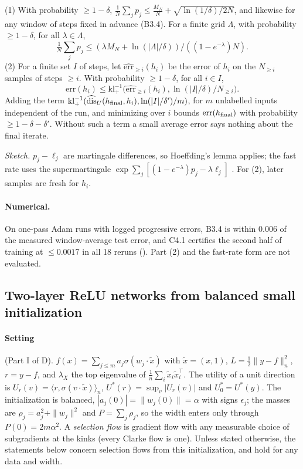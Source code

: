 \begin{proposition}[Propositions B3.4, C4.1, C4.2]\label{prop:C41}
(1) With probability $\ge1-\delta$, $\frac1N\sum_jp_j\le\frac{M_N}N+\sqrt{\ln(1/\delta)/2N}$, and likewise for any window of steps fixed in advance (B3.4). For a finite grid $\Lambda$, with probability $\ge1-\delta$, for all $\lambda\in\Lambda$,
\[
\tfrac1N\textstyle\sum_jp_j\le(\lambda M_N+\ln(|\Lambda|/\delta))/((1-e^{-\lambda})N).
\]
(2) For a finite set $I$ of steps, let $\widehat{\mathrm{err}}_{\ge i}(h_i)$ be the error of $h_i$ on the $N_{\ge i}$ samples of steps $\ge i$. With probability $\ge1-\delta$, for all $i\in I$,
\[
\mathrm{err}(h_i)\le\mathrm{kl}^{-1}_+\bigl(\widehat{\mathrm{err}}_{\ge i}(h_i),\ln(|I|/\delta)/N_{\ge i}\bigr).
\]
Adding the term $\mathrm{kl}^{-1}_+(\widehat{\mathrm{dis}}_U(h_{\rm final},h_i),\ln(|I|/\delta')/m)$, for $m$ unlabelled inputs independent of the run, and minimizing over $i$ bounds $\mathrm{err}(h_{\rm final})$ with probability $\ge1-\delta-\delta'$. Without such a term a small average error says nothing about the final iterate.
\end{proposition}
\noindent\emph{Sketch.} $p_j-\ell_j$ are martingale differences, so Hoeffding's lemma applies; the fast rate uses the supermartingale $\exp\sum_j[(1-e^{-\lambda})p_j-\lambda\ell_j]$ \cite{cesabianchi2004online}. For (2), later samples are fresh for $h_i$.

\paragraph{Numerical.} On one-pass Adam runs with logged progressive errors, B3.4 is within $0.006$ of the measured window-average test error, and C4.1 certifies the second half of training at $\le0.0017$ in all 18 reruns (). Part (2) and the fast-rate form are not evaluated.

\subsection{Two-layer ReLU networks from balanced small initialization}\label{app:networks:relu}

\paragraph{Setting} (Part I of D). $f(x)=\sum_{j\le m}a_j\sigma(w_j\cdot\tilde x)$ with $\tilde x=(x,1)$, $L=\frac12\|y-f\|_n^2$, $r=y-f$, and $\lambda_X$ the top eigenvalue of $\frac1n\sum_i\tilde x_i\tilde x_i^\top$. The utility of a unit direction is $U_r(v)=\langle r,\sigma(v\cdot\tilde x)\rangle_n$, $U^*(r)=\sup_v|U_r(v)|$ and $U_0^*=U^*(y)$. The initialization is balanced, $|a_j(0)|=\|w_j(0)\|=\alpha$ with signs $\epsilon_j$; the masses are $\rho_j=a_j^2+\|w_j\|^2$ and $P=\sum_j\rho_j$, so the width enters only through $P(0)=2m\alpha^2$. A \emph{selection flow} is gradient flow with any measurable choice of subgradients at the kinks (every Clarke flow is one). Unless stated otherwise, the statements below concern selection flows from this initialization, and hold for any data and width.


